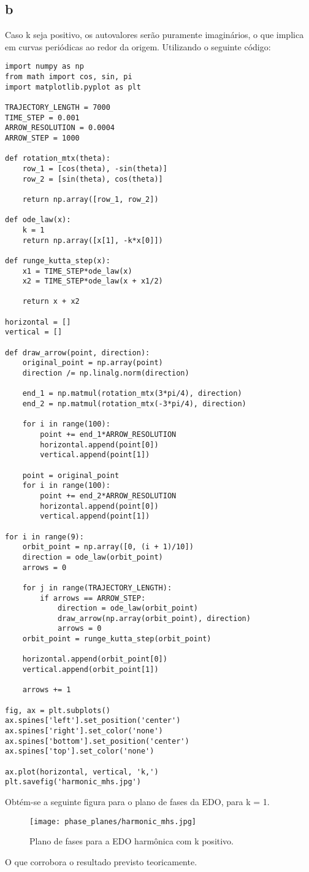 \documentclass{article}[twocolumn]
\begin{document}
	\subsection{b}
	Caso k seja positivo, os autovalores ser\~ao puramente imagin\'arios,
	o que implica em curvas peri\'odicas ao redor da origem. Utilizando
	o seguinte c\'odigo:
	\begin{verbatim}
import numpy as np
from math import cos, sin, pi
import matplotlib.pyplot as plt

TRAJECTORY_LENGTH = 7000
TIME_STEP = 0.001
ARROW_RESOLUTION = 0.0004
ARROW_STEP = 1000

def rotation_mtx(theta):
    row_1 = [cos(theta), -sin(theta)]
    row_2 = [sin(theta), cos(theta)]
    
    return np.array([row_1, row_2])

def ode_law(x):
    k = 1
    return np.array([x[1], -k*x[0]])

def runge_kutta_step(x):
    x1 = TIME_STEP*ode_law(x)
    x2 = TIME_STEP*ode_law(x + x1/2)
    
    return x + x2

horizontal = []
vertical = []

def draw_arrow(point, direction):
    original_point = np.array(point)
    direction /= np.linalg.norm(direction)
    
    end_1 = np.matmul(rotation_mtx(3*pi/4), direction)
    end_2 = np.matmul(rotation_mtx(-3*pi/4), direction)
    
    for i in range(100):
        point += end_1*ARROW_RESOLUTION
        horizontal.append(point[0])
        vertical.append(point[1])
    	
    point = original_point
    for i in range(100):
        point += end_2*ARROW_RESOLUTION
        horizontal.append(point[0])
        vertical.append(point[1])

for i in range(9):
    orbit_point = np.array([0, (i + 1)/10])
    direction = ode_law(orbit_point)
    arrows = 0

    for j in range(TRAJECTORY_LENGTH):
        if arrows == ARROW_STEP:
            direction = ode_law(orbit_point)
            draw_arrow(np.array(orbit_point), direction)
            arrows = 0
    orbit_point = runge_kutta_step(orbit_point)
    
    horizontal.append(orbit_point[0])
    vertical.append(orbit_point[1])
    
    arrows += 1

fig, ax = plt.subplots()
ax.spines['left'].set_position('center')
ax.spines['right'].set_color('none')
ax.spines['bottom'].set_position('center')
ax.spines['top'].set_color('none')

ax.plot(horizontal, vertical, 'k,')
plt.savefig('harmonic_mhs.jpg')

	\end{verbatim}
	Obt\'em-se a seguinte figura para o plano de fases da EDO, para k = 1.
	\begin{figure}[H]
		\centering
		\texttt{[image: phase\_planes/harmonic\_mhs.jpg]}
		\caption{Plano de fases para a EDO harm\^onica com k positivo.}
	\end{figure}
	O que corrobora o resultado previsto teoricamente.
	
\end{document}
